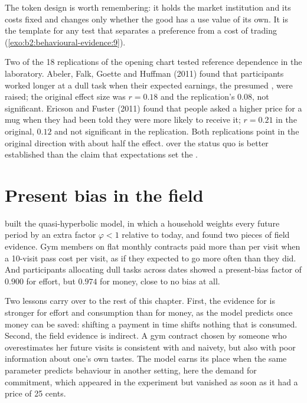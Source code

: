 The token design is worth remembering: it holds the market institution and its costs fixed and changes
only whether the good has a use value of its own. It is the template for any test that separates a
preference from a cost of trading (\cref{exo:b2:behavioural-evidence:9}).

Two of the 18 replications of the opening chart tested reference dependence in the laboratory. Abeler,
Falk, Goette and Huffman (2011) found that participants worked longer at a dull task when their
expected earnings, the presumed , were raised; the original effect size was $r = 0.18$
and the replication's $0.08$, not significant. Ericson and Fuster (2011) found that people asked a
higher price for a mug when they had been told they were more likely to receive it; $r = 0.21$ in the
original, $0.12$ and not significant in the replication. Both replications point in the original
direction with about half the effect.  over the status quo is better established than the
claim that expectations set the .

\section{Present bias in the field}\label{sec:b2:behavioural-evidence:present-bias}

 built the quasi-hyperbolic model, in which a household weights every
future period by an extra factor $\varphi < 1$ relative to today, and found two pieces of field evidence.
Gym members on flat monthly contracts paid more than  per visit when a 10-visit pass cost
 per visit, as if they expected to go more often than they did. And participants allocating dull
tasks across dates showed a present-bias factor of $0.900$ for effort, but $0.974$ for money, close to
no bias at all.

Two lessons carry over to the rest of this chapter. First, the evidence for  is stronger for
effort and consumption than for money, as the model predicts once money can be saved: shifting a payment
in time shifts nothing that is consumed. Second, the field evidence is indirect. A gym contract chosen
by someone who overestimates her future visits is consistent with  and naivety, but also
with poor information about one's own tastes. The model earns its place when the same parameter
predicts behaviour in another setting, here the demand for commitment, which appeared in the experiment
but vanished as soon as it had a price of 25 cents.

